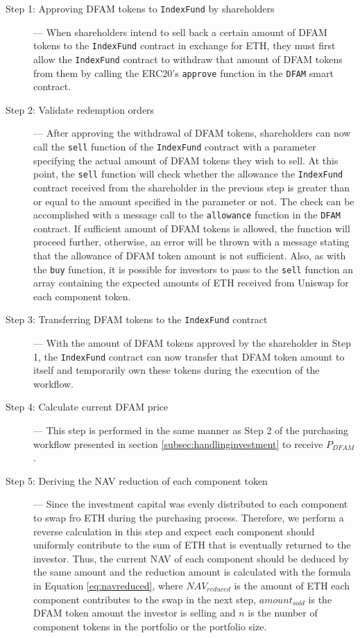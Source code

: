 \begin{description}
  \item[Step 1: Approving DFAM tokens to \texttt{IndexFund} by shareholders] --- When shareholders intend to sell back a certain amount of DFAM tokens to the \texttt{IndexFund} contract in exchange for ETH, they must first allow the \texttt{IndexFund} contract to withdraw that amount of DFAM tokens from them by calling the ERC20's \texttt{approve} function in the \texttt{DFAM} smart contract.

  \item[Step 2: Validate redemption orders] --- After approving the withdrawal of DFAM tokens, shareholders can now call the \texttt{sell} function of the \texttt{IndexFund} contract with a parameter specifying the actual amount of DFAM tokens they wish to sell. At this point, the \texttt{sell} function will check whether the allowance the \texttt{IndexFund} contract received from the shareholder in the previous step is greater than or equal to the amount specified in the parameter or not. The check can be accomplished with a message call to the \texttt{allowance} function in the \texttt{DFAM} contract. If sufficient amount of DFAM tokens is allowed, the function will proceed further, otherwise, an error will be thrown with a message stating that the allowance of DFAM token amount is not sufficient. Also, as with the \texttt{buy} function, it is possible for investors to pass to the \texttt{sell} function an array containing the expected amounts of ETH received from Uniswap for each component token.
  
  \item[Step 3: Transferring DFAM tokens to the \texttt{IndexFund} contract] --- With the amount of DFAM tokens approved by the shareholder in Step 1, the \texttt{IndexFund} contract can now transfer that DFAM token amount to itself and temporarily own these tokens during the execution of the workflow. 
  
  \item[Step 4: Calculate current DFAM price] --- This step is performed in the same manner as Step 2 of the purchasing workflow presented in section \ref{subsec:handlinginvestment} to receive $P_{DFAM}$.

  \item[Step 5: Deriving the NAV reduction of each component token] --- Since the investment capital was evenly distributed to each component to swap fro ETH during the purchasing process. Therefore, we perform a reverse calculation in this step and expect each component should uniformly contribute to the sum of ETH that is eventually returned to the investor. Thus, the current NAV of each component should be deduced by the same amount and the reduction amount is calculated with the formula in Equation \ref{eq:navreduced}, where $NAV_{reduced}$ is the amount of ETH each component contributes to the swap in the next step, $amount_{sold}$ is the DFAM token amount the investor is selling and $n$ is the number of component tokens in the portfolio or the portfolio size. 
  

\end{description}

